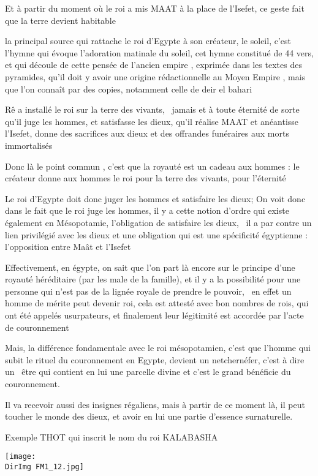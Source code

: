 \documentclass[a4paper]{article}
\newcommand{\DirImg}{../img/FaivreMartin/}
\begin{document}
Et à partir du moment où le roi a mis MAAT à la place de l'Isefet, ce geste fait que la terre devient habitable


la principal source qui rattache le roi d'Egypte à son créateur, le soleil, c'est l'hymne qui évoque l'adoration
matinale du soleil, cet hymne constitué de 44 vers, et qui découle de cette pensée de l'ancien empire , exprimée dans
les textes des pyramides, qu'il doit y avoir une origine rédactionnelle au Moyen Empire , mais que l'on connaît par des
copies, notamment celle de deir el bahari


Rê a installé le roi sur la terre des vivants, \ jamais et à toute éternité de sorte qu'il juge les hommes, et
satisfasse les dieux, qu'il réalise MAAT et anéantisse l'Isefet, donne des sacrifices aux dieux et des offrandes
funéraires aux morts immortalisés


Donc là le point commun , c'est que la royauté est un cadeau aux hommes : le créateur donne aux hommes le roi pour la
terre des vivants, pour l'éternité

Le roi d'Egypte doit donc juger les hommes et satisfaire les dieux; On voit donc dans le fait que le roi juge les
hommes, il y a cette notion d'ordre qui existe également en Mésopotamie, l'obligation de satisfaire les dieux, \ il a
par contre un lien privilégié avec les dieux et une obligation qui est une spécificité égyptienne : l'opposition entre
Maât et l'Isefet


Effectivement, en égypte, on sait que l'on part là encore sur le principe d'une royauté héréditaire (par les male de la
famille), et il y a la possibilité pour une personne qui n'est pas de la lignée royale de prendre le pouvoir, \ en
effet un homme de mérite peut devenir roi, cela est attesté avec bon nombres de rois, qui ont été appelés usurpateurs,
et finalement leur légitimité est accordée par l'acte de couronnement


Mais, la différence fondamentale avec le roi mésopotamien, c'est que l'homme qui subit le rituel du couronnement en
Egypte, devient un netchernéfer, c'est à dire un \ être qui contient en lui une parcelle divine et c'est le grand
bénéficie du couronnement.

Il va recevoir aussi des insignes régaliens, mais à partir de ce moment là, il peut toucher le monde des dieux, et avoir
en lui une partie d'essence surnaturelle.


Exemple THOT qui inscrit le nom du roi KALABASHA


 \texttt{[image: \\DirImg FM1\_12.jpg]} 
\end{document}
